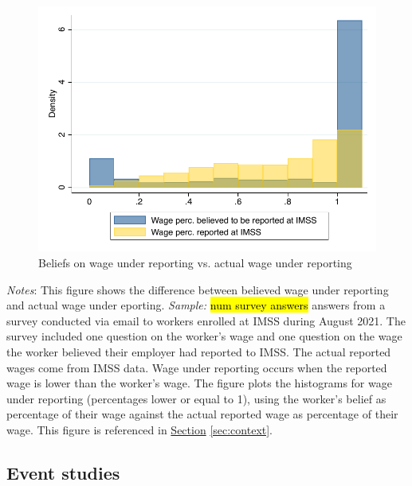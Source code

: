 \documentclass[oneside,11pt]{article}
\begin{document}
\begin{figure}[H]
    \centering
    \caption{Beliefs on wage under reporting vs. actual wage under reporting \label{fig:hist_perc_sal_survey}}
    \includegraphics[width=\textwidth]{04_Figures/worker_survey/hist_perc_sal_survey.pdf}
\end{figure}
\scriptsize{\textit{Notes}: This figure shows the difference between believed wage under reporting and actual wage under eporting. \textit{Sample:} \hl{num survey answers} answers from a survey conducted via email to workers enrolled at IMSS during August 2021. The survey included one question on the worker's wage and one question on the wage the worker believed their employer had reported to IMSS. The actual reported wages come from IMSS data. Wage under reporting occurs when the reported wage is lower than the worker's wage. The figure plots the histograms for wage under reporting (percentages lower or equal to 1), using the worker's belief as percentage of their wage against the actual reported wage as percentage of their wage. This figure is referenced in \hyperref[sec:context]{Section} \ref{sec:context}.}

\clearpage

\subsection{Event studies}
\end{document}
